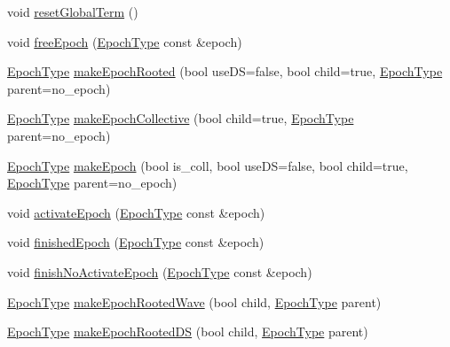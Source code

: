 \begin{DoxyCompactItemize}
\item 
void \hyperlink{structvt_1_1term_1_1_termination_detector_a756e767b99e869966247c9198403afb6}{reset\+Global\+Term} ()
\item 
void \hyperlink{structvt_1_1term_1_1_termination_detector_a3b1e4a0d87c5af08fc36925ec74504fd}{free\+Epoch} (\hyperlink{namespacevt_a985a5adf291c34a3ca263b3378388236}{Epoch\+Type} const \&epoch)
\item 
\hyperlink{namespacevt_a985a5adf291c34a3ca263b3378388236}{Epoch\+Type} \hyperlink{structvt_1_1term_1_1_termination_detector_af8072e5e5c2262c97040a5891d60df6e}{make\+Epoch\+Rooted} (bool use\+DS=false, bool child=true, \hyperlink{namespacevt_a985a5adf291c34a3ca263b3378388236}{Epoch\+Type} parent=no\+\_\+epoch)
\item 
\hyperlink{namespacevt_a985a5adf291c34a3ca263b3378388236}{Epoch\+Type} \hyperlink{structvt_1_1term_1_1_termination_detector_ab60c7f5ae946139a71f02443b120eeab}{make\+Epoch\+Collective} (bool child=true, \hyperlink{namespacevt_a985a5adf291c34a3ca263b3378388236}{Epoch\+Type} parent=no\+\_\+epoch)
\item 
\hyperlink{namespacevt_a985a5adf291c34a3ca263b3378388236}{Epoch\+Type} \hyperlink{structvt_1_1term_1_1_termination_detector_a26df41c1ce8b49f5dc681611a416e8a8}{make\+Epoch} (bool is\+\_\+coll, bool use\+DS=false, bool child=true, \hyperlink{namespacevt_a985a5adf291c34a3ca263b3378388236}{Epoch\+Type} parent=no\+\_\+epoch)
\item 
void \hyperlink{structvt_1_1term_1_1_termination_detector_af9f932ff57f12da573a75adbbaee73df}{activate\+Epoch} (\hyperlink{namespacevt_a985a5adf291c34a3ca263b3378388236}{Epoch\+Type} const \&epoch)
\item 
void \hyperlink{structvt_1_1term_1_1_termination_detector_ad54d75c50bd3f34f30247817737bc303}{finished\+Epoch} (\hyperlink{namespacevt_a985a5adf291c34a3ca263b3378388236}{Epoch\+Type} const \&epoch)
\item 
void \hyperlink{structvt_1_1term_1_1_termination_detector_a349739e9ee6dea98a863b4afb1e49c10}{finish\+No\+Activate\+Epoch} (\hyperlink{namespacevt_a985a5adf291c34a3ca263b3378388236}{Epoch\+Type} const \&epoch)
\item 
\hyperlink{namespacevt_a985a5adf291c34a3ca263b3378388236}{Epoch\+Type} \hyperlink{structvt_1_1term_1_1_termination_detector_af3a8e284b580b295dfb3befe7752fdd5}{make\+Epoch\+Rooted\+Wave} (bool child, \hyperlink{namespacevt_a985a5adf291c34a3ca263b3378388236}{Epoch\+Type} parent)
\item 
\hyperlink{namespacevt_a985a5adf291c34a3ca263b3378388236}{Epoch\+Type} \hyperlink{structvt_1_1term_1_1_termination_detector_a80e88dba4ae3462a9c7a4be5c4cebbc1}{make\+Epoch\+Rooted\+DS} (bool child, \hyperlink{namespacevt_a985a5adf291c34a3ca263b3378388236}{Epoch\+Type} parent)

\end{DoxyCompactItemize}
